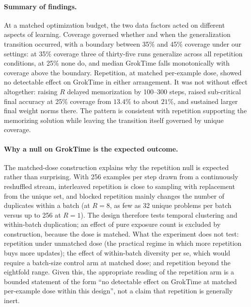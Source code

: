 \documentclass[10pt]{article}
\newcommand{\groktime}{GrokTime}
\begin{document}
\paragraph{Summary of findings.}
At a matched optimization budget, the two data factors acted on different aspects of learning. Coverage governed whether and when the generalization transition occurred, with a boundary between 35\% and 45\% coverage under our settings: at 35\% coverage three of thirty-five runs generalize across all repetition conditions, at 25\% none do, and median \groktime{} falls monotonically with coverage above the boundary. Repetition, at matched per-example dose, showed no detectable effect on \groktime{} in either arrangement. It was not without effect altogether: raising $R$ delayed memorization by 100--300 steps, raised sub-critical final accuracy at 25\% coverage from $13.4\%$ to about $21\%$, and sustained larger final weight norms there. The pattern is consistent with repetition supporting the memorizing solution while leaving the transition itself governed by unique coverage.

\paragraph{Why a null on \groktime{} is the expected outcome.}
The matched-dose construction explains why the repetition null is expected rather than surprising. With 256 examples per step drawn from a continuously reshuffled stream, interleaved repetition is close to sampling with replacement from the unique set, and blocked repetition mainly changes the number of duplicates within a batch (at $R=8$, as few as 32 unique problems per batch versus up to 256 at $R=1$). The design therefore tests temporal clustering and within-batch duplication; an effect of pure exposure count is excluded by construction, because the dose is matched. What the experiment does not test: repetition under unmatched dose (the practical regime in which more repetition buys more updates); the effect of within-batch diversity per se, which would require a batch-size control arm at matched dose; and repetition beyond the eightfold range. Given this, the appropriate reading of the repetition arm is a bounded statement of the form ``no detectable effect on \groktime{} at matched per-example dose within this design'', not a claim that repetition is generally inert.
\end{document}
